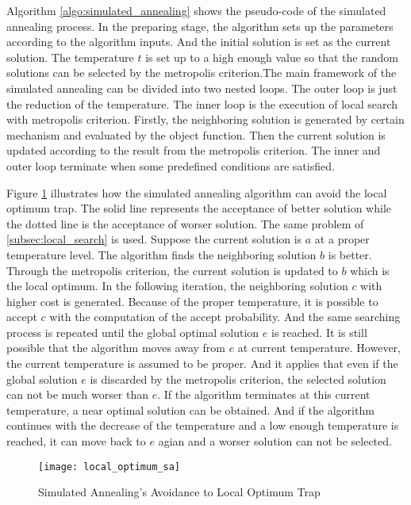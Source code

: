 		
		
		Algorithm \ref{algo:simulated_annealing} shows the pseudo-code of the simulated
		annealing process. In the preparing stage, the algorithm sets up the parameters
		according to the algorithm inputs. And the initial solution is set as the current
		solution. The temperature $t$ is set up to a high enough value so that the random
		solutions can be selected by the metropolis criterion.The main framework of the
		simulated annealing can be divided into two nested loops. The outer loop is just the
		reduction of the temperature.
		The inner loop is the execution of local search with metropolis criterion.
		Firstly, the neighboring solution is generated by certain mechanism and evaluated by the
		object function. Then the current solution is updated according to the result from
		the metropolis criterion.
		The inner and outer loop terminate when some predefined conditions are satisfied.

		Figure \ref{fig:local_optimum_sa} illustrates how the simulated annealing algorithm
		can avoid the local optimum trap. The solid line represents the acceptance of better
		solution while the dotted line is the acceptance of worser solution.
		The same problem of \ref{subsec:local_search} is used.
		Suppose the current solution is $a$ at a proper temperature level. The algorithm finds
		the neighboring solution $b$ is better. Through the metropolis criterion, the current
		solution is updated to $b$ which is the local optimum. In the following iteration, the 
		neighboring solution $c$ with higher cost is generated. Because of the proper
		temperature, it is possible to accept $c$ with the computation of the accept probability.
		And the same searching process is repeated until the global optimal solution $e$ is reached.
		It is still possible that the algorithm moves away from $e$ at current temperature.
		However, the current temperature is assumed to be proper. And it applies that even if the
		global solution $e$ is discarded by the metropolis criterion, the selected solution can not
		be much worser than $e$. If the algorithm terminates at this current temperature, a near
		optimal solution can be obtained. And if the algorithm continues with the decrease of
		the temperature and a low enough temperature is reached, it can move back to $e$ agian
		and a worser solution can not be selected.
		 
		\begin{figure}[H]
			\begin{center}
				\texttt{[image: local\_optimum\_sa]}
				\caption{Simulated Annealing's Avoidance to Local Optimum Trap}
				\label{fig:local_optimum_sa}
			\end{center}
		\end{figure}
		
